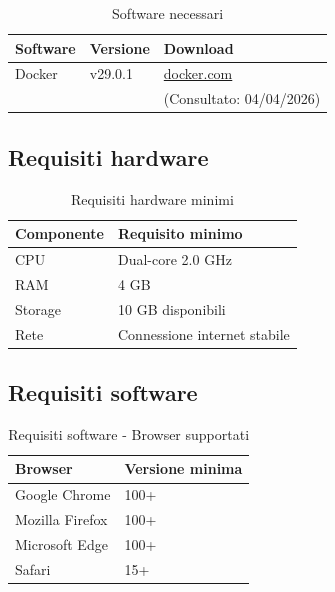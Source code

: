 \documentclass[a4paper,10pt]{article}
\begin{document}
\begin{table}[H]
\centering
\renewcommand{\arraystretch}{1.3}
\begin{tabular}{|l|l|l|}
\hline
\textbf{Software} & \textbf{Versione} & \textbf{Download} \\ \hline

Docker & v29.0.1 & \href{https://www.docker.com}{docker.com} \\ 
& & \small (Consultato: 04/04/2026) \\ \hline

\end{tabular}
\caption{Software necessari}
\end{table}

\subsection{Requisiti hardware}
\begin{table}[H]
\centering
\renewcommand{\arraystretch}{1.3}
\begin{tabular}{|l|l|}
\hline
\textbf{Componente} & \textbf{Requisito minimo} \\ \hline

CPU & Dual-core 2.0 GHz \\ 
RAM & 4 GB \\ 
Storage & 10 GB disponibili \\ 
Rete & Connessione internet stabile \\ \hline

\end{tabular}
\caption{Requisiti hardware minimi}
\end{table}

\subsection{Requisiti software}
\begin{table}[H]
\centering
\renewcommand{\arraystretch}{1.3}
\begin{tabular}{|l|l|}
\hline
\textbf{Browser} & \textbf{Versione minima} \\ \hline

Google Chrome & 100+ \\ 
Mozilla Firefox & 100+ \\ 
Microsoft Edge & 100+ \\ 
Safari & 15+ \\ \hline

\end{tabular}
\caption{Requisiti software - Browser supportati}
\end{table}
\end{document}
